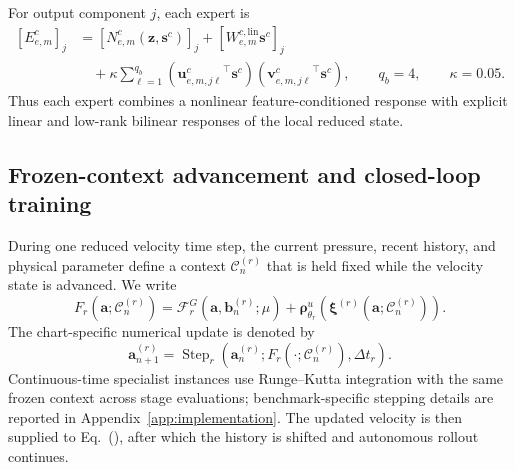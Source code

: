 For output component $j$, each expert is
\begin{align}
  \left[E_{e,m}^c\right]_j
  &=
  \left[
    N_{e,m}^c
    \left(
      \bm z,\bm s^c
    \right)
  \right]_j
  +
  \left[
    W_{e,m}^{c,\mathrm{lin}}
    \bm s^c
  \right]_j
  \nonumber\\
  &\quad+
  \kappa
  \sum_{\ell=1}^{q_b}
  \left(
    {\bm u_{e,m,j\ell}^c}^{\top}
    \bm s^c
  \right)
  \left(
    {\bm v_{e,m,j\ell}^c}^{\top}
    \bm s^c
  \right),
  \qquad
  q_b=4,
  \qquad
  \kappa=0.05.
  \label{eq:app_structured_expert}
\end{align}
Thus each expert combines a nonlinear feature-conditioned response with
explicit linear and low-rank bilinear responses of the local reduced state.


\subsection{Frozen-context advancement and closed-loop training}

During one reduced velocity time step, the current pressure, recent history, and
physical parameter define a context $\mathcal C_n^{(r)}$ that is held fixed
while the velocity state is advanced. We write
\begin{equation}
  F_r
  \left(
    \bm a;\mathcal C_n^{(r)}
  \right)
  =
  \mathcal F_r^G
  \left(
    \bm a,\bm b_n^{(r)};\mu
  \right)
  +
  \bm\rho^u_{\theta_r}
  \left(
    \bm\xi^{(r)}
    \left(
      \bm a;\mathcal C_n^{(r)}
    \right)
  \right).
  \label{eq:app_frozen_context_rhs}
\end{equation}
The chart-specific numerical update is denoted by
\begin{equation}
  \bm a_{n+1}^{(r)}
  =
  \operatorname{Step}_r
  \left(
    \bm a_n^{(r)};
    F_r(\cdot;\mathcal C_n^{(r)}),
    \Delta t_r
  \right).
  \label{eq:app_specialist_step}
\end{equation}
Continuous-time specialist instances use Runge--Kutta integration with the
same frozen context across stage evaluations; benchmark-specific stepping
details are reported in Appendix~\ref{app:implementation}.
The updated velocity is then supplied to
Eq.~(), after which the history is
shifted and autonomous rollout continues.

